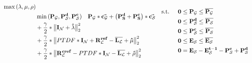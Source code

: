 \begin{subequations}
	\begin{align}
		\max{(\lambda, \mu, \rho)} \label{eq:opt_admm_matrix_scaled}\\
		 & \min{(\vb{P_\mathcal{G}}, \vb{P_\mathcal{S}^d}, \vb{P_\mathcal{S}^c})} \quad \vb{P_\mathcal{G}} * \va{c_\mathcal{G}} + \left(\vb{P_S^d} + \vb{P_S^c}\right) * \va{c_\mathcal{S}} \nonumber \\
		 & + \frac{\gamma}{2} * \big\|\vb{I_\mathcal{N}} + \vb{\hat{\lambda}}\big\|_2^2 \nonumber \\
		 & + \frac{\gamma}{2} * \big\| PTDF * \vb{I_\mathcal{N}} + \vb{R_\mathcal{L}^{ref}} - \vb{\overline{L_\mathcal{L}}} + \vb{\hat{\mu}} \big\|_2^2 \nonumber \\
		 & + \frac{\gamma}{2} * \big\| \vb{R_\mathcal{L}^{cref}} - PTDF * \vb{I_\mathcal{N}} - \vb{\overline{L_\mathcal{L}}} + \vb{\hat{\rho}} \big\|_2^2 \nonumber
	\end{align}
		\begin{align}
		 \text{s.t. } \quad & \vb{0} \leq \vb{P_\mathcal{G}} \leq \vb{\overline{P_\mathcal{G}}} \\
		 & \vb{0} \leq \vb{P_\mathcal{S}^d} \leq \vb{\overline{P_\mathcal{S}}} \\
		 & \vb{0} \leq \vb{P_\mathcal{S}^c} \leq \vb{\overline{P_\mathcal{S}}} \\
		 & \vb{0} \leq \vb{E_\mathcal{S}} \leq \vb{\overline{E_\mathcal{S}}}\\
		 & \vb{0} = \vb{E_\mathcal{S}} - \vb{E_\mathcal{S}^{t-1}} - \vb{P_\mathcal{S}^c} + \vb{P_\mathcal{S}^d}
	\end{align}
\end{subequations}

